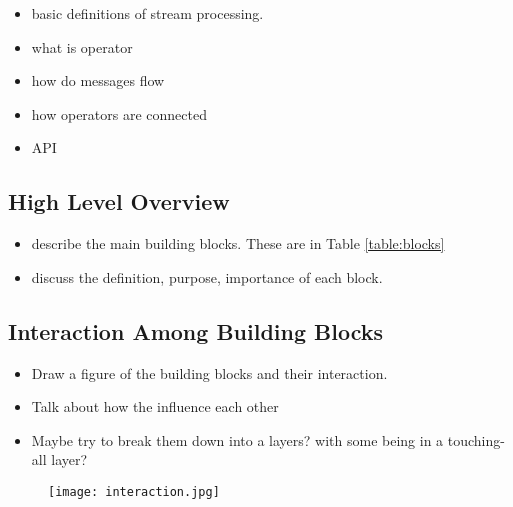 \begin{itemize}
	\item basic definitions of stream processing. 
	\item what is operator
	\item how do messages flow
	\item how operators are connected
	\item API
\end{itemize}





\subsection{High Level Overview}
\begin{itemize}
	\item describe the main building blocks. These are in Table \ref{table:blocks}
	\item discuss the definition, purpose, importance of each block.	
\end{itemize}


\begin{table}[h]
\end{table}




\subsection{Interaction Among Building Blocks}

\begin{itemize}
	\item Draw a figure of the building blocks and their interaction. 
	\item Talk about how the influence each other
	\item Maybe try to break them down into a layers? with some being in a touching-all layer?
\end{itemize}


%

\begin{figure}[h]
	\centering
	\texttt{[image: interaction.jpg]}
	\caption{}
	\label{fig:tree-cpVScl}
\end{figure}


